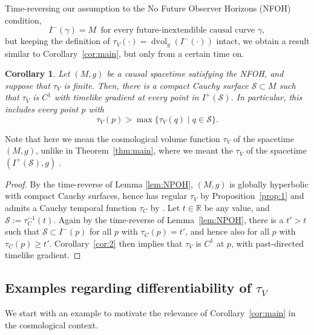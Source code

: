 \documentclass[a4paper,11pt]{amsart}
\newtheorem{corollary}[theorem]{{Corollary}}%
\newcommand{\R}{\mathbb{R}}
\newcommand{\vol}{\operatorname{dvol}_g}
\newcommand{\CS}{\mathcal{S}}
\begin{document}
Time-reversing our assumption to the No Future Observer Horizons (NFOH) condition,
\begin{equation*}
     I^-(\gamma) = M \ \text{ for every future-inextendible causal curve } \gamma,
\end{equation*}
but keeping the definition of $\tau_V(\cdot) = \vol(I^-(\cdot))$ intact, we obtain a result similar to Corollary~\ref{cor:main}, but only from a certain time on.

\begin{corollary}
    Let $(M,g)$ be a causal spacetime satisfying the NFOH, and suppose that $\tau_V$ is finite. Then, there is a compact Cauchy surface $\CS \subset M$ such that $\tau_V$ is $C^1$ with timelike gradient at every point in $I^+(\CS)$. In particular, this includes every point $p$ with
    \begin{equation*}
        \tau_V(p) > \max\{\tau_V(q) \mid q \in \CS \}.
    \end{equation*}
\end{corollary}

Note that here we mean the cosmological volume function $\tau_V$ of the spacetime $(M,g)$, unlike in Theorem~\ref{thm:main}, where we meant the $\tau_V$ of the spacetime $(I^+(\CS),g)$ .

\begin{proof}
    By the time-reverse of Lemma \ref{lem:NPOH}, $(M,g)$ is globally hyperbolic with compact Cauchy surfaces, hence has regular $\tau_V$ by Proposition~\ref{prop:1} and admits a Cauchy temporal function $\tau_C$ by \cite{BeSa05}. Let $t \in \R$ be any value, and $\CS := \tau_C^{-1}(t)$. Again by the time-reverse of Lemma~\ref{lem:NPOH}, there is a $t' > t$ such that $\CS \subset I^-(p)$ for all $p$ with $\tau_C(p) = t'$, and hence also for all $p$ with $\tau_C(p) \geq t'$. Corollary~\ref{cor:2} then implies that $\tau_V$ is $C^1$ at $p$, with past-directed timelike gradient.
\end{proof}

\subsection{Examples regarding differentiability of $\tau_V$}

We start with an example to motivate the relevance of Corollary~\ref{cor:main} in the cosmological context.
\end{document}
